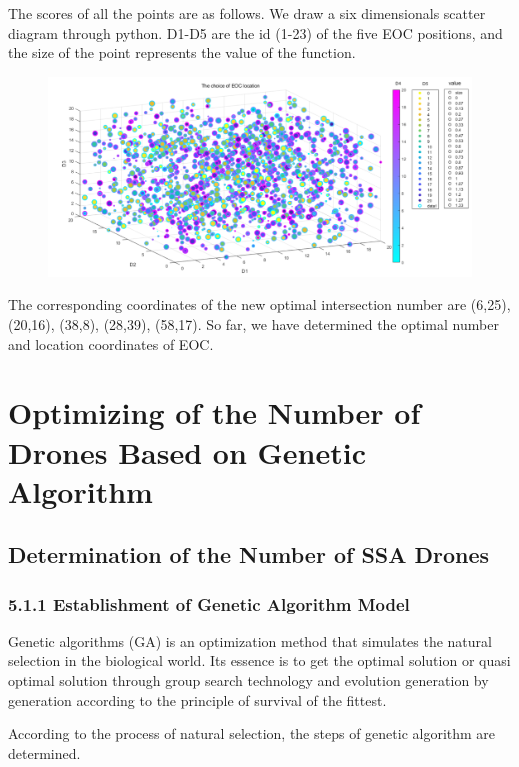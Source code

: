 \documentclass{mcmthesis}
\begin{document}
The scores of all the points are as follows. We draw a six dimensionals scatter diagram through python. D1-D5 are the id (1-23) of the five EOC positions, and the size of the point represents the value of the function.

\begin{figure}[H]
  \centering
  \includegraphics[scale=0.4]{image/9.png}
  
\end{figure}


The corresponding coordinates of the new optimal intersection number are  (6,25), (20,16), (38,8), (28,39), (58,17). So far, we have determined the optimal number and location coordinates of EOC.


\section{Optimizing of the Number of Drones Based on Genetic Algorithm}


\subsection{Determination of the Number of SSA Drones}
\subsubsection*{5.1.1 Establishment of Genetic Algorithm Model}
Genetic algorithms (GA) is an optimization method that simulates the natural selection in the biological world. Its essence is to get the optimal solution or quasi optimal solution through group search technology and evolution generation by generation according to the principle of survival of the fittest.

According to the process of natural selection, the steps of genetic algorithm are determined.
\end{document}
